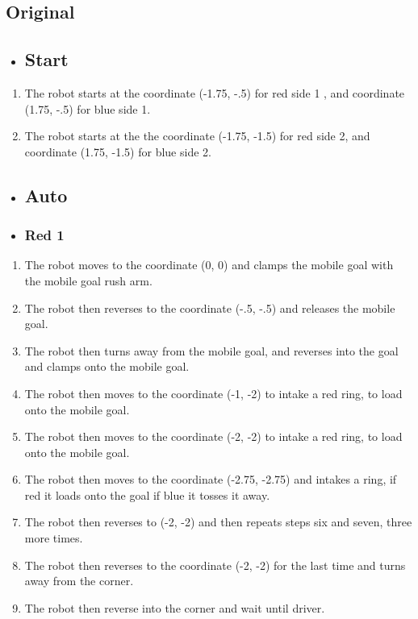 \subsection{Original}
\begin{itemize}
    \item \subsection{Start}
\end{itemize}
\begin{enumerate}
    \item The robot starts at the coordinate (-1.75, -.5) for red side 1 , and coordinate (1.75, -.5) for blue side 1.
    \item The robot starts at the the coordinate (-1.75, -1.5) for red side 2, and coordinate (1.75, -1.5) for blue side 2.
\end{enumerate}
\begin{itemize}
    \item \subsection{Auto}
    \item \subsubsection{Red 1}
\end{itemize}
\begin{enumerate}
    \item The robot moves to the coordinate (0, 0) and clamps the mobile goal with the mobile goal rush arm.
    \item The robot then reverses to the coordinate (-.5, -.5) and releases the mobile goal.
    \item The robot then turns away from the mobile goal, and reverses into the goal and clamps onto the mobile goal.
    \item The robot then moves to the coordinate (-1, -2) to intake a red ring, to load onto the mobile goal.
    \item The robot then moves to the coordinate (-2, -2) to intake a red ring, to load onto the mobile goal.
    \item The robot then moves to the coordinate (-2.75, -2.75) and intakes a ring, if red it loads onto the goal if blue it tosses it away.
    \item The robot then reverses to (-2, -2) and then repeats steps six and seven, three more times.
    \item The robot then reverses to the coordinate (-2, -2) for the last time and turns away from the corner.
    \item The robot then reverse into the corner and wait until driver.
\end{enumerate}
